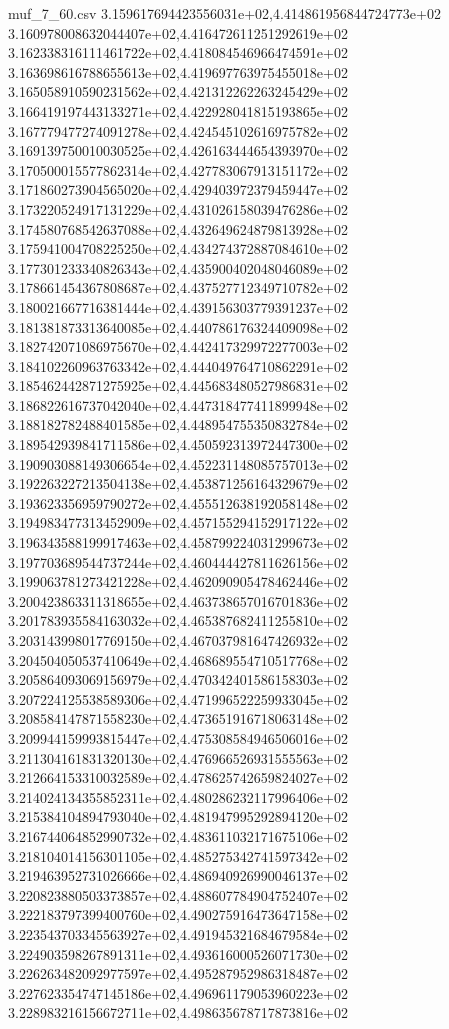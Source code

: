 \begin{filecontents*}{muf_7_60.csv}
3.159617694423556031e+02,4.414861956844724773e+02
3.160978008632044407e+02,4.416472611251292619e+02
3.162338316111461722e+02,4.418084546966474591e+02
3.163698616788655613e+02,4.419697763975455018e+02
3.165058910590231562e+02,4.421312262263245429e+02
3.166419197443133271e+02,4.422928041815193865e+02
3.167779477274091278e+02,4.424545102616975782e+02
3.169139750010030525e+02,4.426163444654393970e+02
3.170500015577862314e+02,4.427783067913151172e+02
3.171860273904565020e+02,4.429403972379459447e+02
3.173220524917131229e+02,4.431026158039476286e+02
3.174580768542637088e+02,4.432649624879813928e+02
3.175941004708225250e+02,4.434274372887084610e+02
3.177301233340826343e+02,4.435900402048046089e+02
3.178661454367808687e+02,4.437527712349710782e+02
3.180021667716381444e+02,4.439156303779391237e+02
3.181381873313640085e+02,4.440786176324409098e+02
3.182742071086975670e+02,4.442417329972277003e+02
3.184102260963763342e+02,4.444049764710862291e+02
3.185462442871275925e+02,4.445683480527986831e+02
3.186822616737042040e+02,4.447318477411899948e+02
3.188182782488401585e+02,4.448954755350832784e+02
3.189542939841711586e+02,4.450592313972447300e+02
3.190903088149306654e+02,4.452231148085757013e+02
3.192263227213504138e+02,4.453871256164329679e+02
3.193623356959790272e+02,4.455512638192058148e+02
3.194983477313452909e+02,4.457155294152917122e+02
3.196343588199917463e+02,4.458799224031299673e+02
3.197703689544737244e+02,4.460444427811626156e+02
3.199063781273421228e+02,4.462090905478462446e+02
3.200423863311318655e+02,4.463738657016701836e+02
3.201783935584163032e+02,4.465387682411255810e+02
3.203143998017769150e+02,4.467037981647426932e+02
3.204504050537410649e+02,4.468689554710517768e+02
3.205864093069156979e+02,4.470342401586158303e+02
3.207224125538589306e+02,4.471996522259933045e+02
3.208584147871558230e+02,4.473651916718063148e+02
3.209944159993815447e+02,4.475308584946506016e+02
3.211304161831320130e+02,4.476966526931555563e+02
3.212664153310032589e+02,4.478625742659824027e+02
3.214024134355852311e+02,4.480286232117996406e+02
3.215384104894793040e+02,4.481947995292894120e+02
3.216744064852990732e+02,4.483611032171675106e+02
3.218104014156301105e+02,4.485275342741597342e+02
3.219463952731026666e+02,4.486940926990046137e+02
3.220823880503373857e+02,4.488607784904752407e+02
3.222183797399400760e+02,4.490275916473647158e+02
3.223543703345563927e+02,4.491945321684679584e+02
3.224903598267891311e+02,4.493616000526071730e+02
3.226263482092977597e+02,4.495287952986318487e+02
3.227623354747145186e+02,4.496961179053960223e+02
3.228983216156672711e+02,4.498635678717873816e+02

\end{filecontents*}
